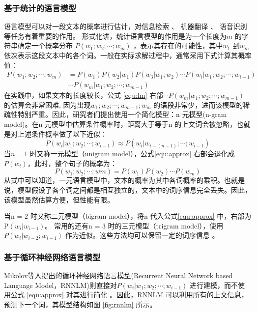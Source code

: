 \documentclass[12pt,a4paper]{article}
\begin{document}
\subsubsection{基于统计的语言模型}
语言模型可以对一段文本的概率进行估计，对信息检索 \cite{Jin:2002:TLM:564376.564386}、 机器翻译 \cite{DBLP:conf/naacl/BaltescuB15}、 语音识别 \cite{DBLP:conf/interspeech/SakSB14} 等任务有着重要的作用。
形式化讲，统计语言模型的作用是为一个长度为$m$ 的字符串确定一个概率分布 $P(w_1;w_2;\cdots;w_m)$ ，表示其存在的可能性，其中$w_1$ 到$w_m$ 依次表示这段文本中的各个词。一般在实际求解过程中，通常采用下式计算其概率值：
\begin{equation}
\label{equ:lm}
\begin{split}
P(w_1;w_2; \cdots;w_m) &= P(w_1) P(w_2|w_1) P(w_3|w_1;w_2)\cdots P(w_i | w_1;w_2;\cdots;w_{i-1}) \\
&\cdots P(w_m | w_1;w_2;\cdots;w_{m-1})
\end{split}
\end{equation}
在实践中，如果文本的长度较长，公式 \ref{equ:lm} 右部$\cdots P(w_m | w_1;w_2;\cdots;w_{m-1}) $  的估算会非常困难, 因为出现$w_1;w_2;\cdots;w_{m-1};w_{m}$ 的语段非常少，进而该模型的稀疏性特别严重。因此，研究者们提出使用一个简化模型：n 元模型(n-gram model)。在n 元模型中估算条件概率时，距离大于等于n 的上文词会被忽略，也就是对上述条件概率做了以下近似：
\begin{equation}
\label{equ:approx}
P(w_i | w_1;w_2;\cdots;w_{i-1})  \approx P(w_i | w_{i-(n-1)};\cdots;w_{i-1})
\end{equation}
当$n = 1$ 时又称一元模型（unigram model），公式\ref{equ:approx} 右部会退化成$P(w_i)$，此时，整个句子的概率为：
\begin{equation}
P(w_1;w_2; \cdots;wm) = P(w_1)P(w_2) \cdots P(w_m)
\end{equation}
从式中可以知道，一元语言模型中，文本的概率为其中各词概率的乘积。也就是说，模型假设了各个词之间都是相互独立的，文本中的词序信息完全丢失。因此，该模型虽然估算方便，但性能有限。

当n = 2 时又称二元模型（bigram model），将n 代入公式\ref{equ:approx} 中，右部为P$(w_i|w_{i-1})$。 常用的还有n = 3 时的三元模型（trigram model），使用$P(w_i |w_{i-2};w_{i-1})$ 作为近似。这些方法均可以保留一定的词序信息 \cite{DBLP:journals/csl/ChenG99}。

\subsubsection{基于循环神经网络语言模型}
\label{sec:rnnlm}
Mikolov等人提出的循环神经网络语言模型(Recurrent Neural Network based Language Model，RNNLM)则直接对$P(w_i | w_1;w_2;\cdots;w_{i-1}) $ 进行建模，而不使用公式 \ref{equ:approx} 对其进行简化\cite{mikolov2012statistical,DBLP:conf/interspeech/MikolovKBCK10} 。因此，RNNLM 可以利用所有的上文信息，预测下一个词，其模型结构如图 \ref{fig:rnnlm} 所示。
\end{document}
